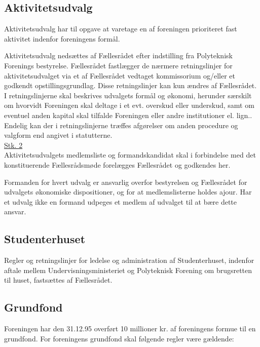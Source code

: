 \begin{list}
\subsection{Aktivitetsudvalg}
\label{L:kap:aktivitetsudvalg}
\item Aktivitetsudvalg har til opgave at varetage en af foreningen prioriteret fast aktivitet indenfor foreningens formål.

\item \label{L:Aktivitet:nedsaettelse} Aktivitetsudvalg nedsættes af Fællesrådet efter indstilling fra Polyteknisk Forenings bestyrelse. Fællesrådet fastlægger de nærmere retningslinjer for aktivitetsudvalget via et af Fællesrådet vedtaget kommissorium og/eller et godkendt opstillingsgrundlag. Disse retningslinjer kan kun ændres af Fællesrådet. I retningslinjerne skal beskrives udvalgets formål og økonomi, herunder særskilt om hvorvidt Foreningen skal deltage i et evt. overskud eller underskud, samt om eventuel anden kapital skal tilfalde Foreningen eller andre institutioner el. lign.. Endelig kan der i retningslinjerne træffes afgørelser om anden procedure og valgform end angivet i statutterne.\\

\underline{Stk. 2}\\
Aktivitetsudvalgets medlemsliste og formandskandidat skal i forbindelse med det konstituerende Fællesrådsmøde forelægges Fællesrådet og godkendes her.\\

\item Formanden for hvert udvalg er ansvarlig overfor bestyrelsen og Fællesrådet for udvalgets økonomiske dispositioner, og for at medlemslisterne holdes ajour. Har et udvalg ikke en formand udpeges et medlem af udvalget til at bære dette ansvar.
\subsection{Studenterhuset}
\item Regler og retningslinjer for ledelse og administration af Studenterhuset, indenfor aftale mellem Undervisningsministeriet og Polyteknisk Forening om brugsretten til huset, fastsættes af Fællesrådet.
\subsection{Grundfond}
\item \label{L:Grundfond:10mio} Foreningen har den 31.12.95 overført 10 millioner kr. af foreningens formue til en grundfond. For foreningens grundfond skal følgende regler være gældende:


\end{list}
